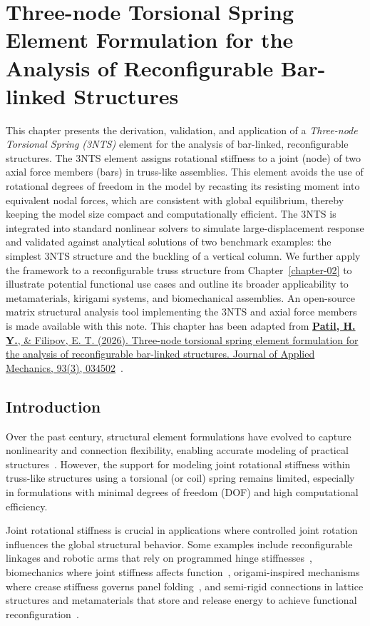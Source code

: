 \chapter{Three-node Torsional Spring Element Formulation for the Analysis of Reconfigurable Bar-linked Structures}\label{chapter-03}
This chapter presents the derivation, validation, and application of a \textit{Three-node Torsional Spring (3NTS)} element for the analysis of bar-linked, reconfigurable structures. The 3NTS element assigns rotational stiffness to a joint  (node) of two axial force members (bars) in truss-like assemblies. This element avoids the use of rotational degrees of freedom in the model by recasting its resisting moment into equivalent nodal forces, which are consistent with global equilibrium, thereby keeping the model size compact and computationally efficient. The 3NTS is integrated into standard nonlinear solvers to simulate large-displacement response and validated against analytical solutions of two benchmark examples: the simplest 3NTS structure and the buckling of a vertical column. We further apply the framework to a reconfigurable truss structure from Chapter~\ref{chapter-02} to illustrate potential functional use cases and outline its broader applicability to metamaterials, kirigami systems, and biomechanical assemblies. An open-source matrix structural analysis tool implementing the 3NTS and axial force members is made available with this note. This chapter has been adapted from \href{https://doi.org/10.1115/1.4070821}{\textbf{Patil, H. Y.}, \& Filipov, E. T. (2026). Three-node torsional spring element formulation for the analysis of reconfigurable bar-linked structures. Journal of Applied Mechanics, 93(3), 034502}~\cite{patil20263nts}.

\section{Introduction}\label{03-sec-torsional-spring-intro}
Over the past century, structural element formulations have evolved to capture nonlinearity and connection flexibility, enabling accurate modeling of practical structures~\cite{felippa2001history}. However, the support for modeling joint rotational stiffness within truss-like structures using a torsional (or coil) spring remains limited, especially in formulations with minimal degrees of freedom (DOF) and high computational efficiency.

Joint rotational stiffness is crucial in applications where controlled joint rotation influences the global structural behavior. Some examples include reconfigurable linkages and robotic arms that rely on programmed hinge stiffnesses~\cite{kim2014design,franco2021static,knox2009unidirectional,dumas2012joint}, biomechanics where joint stiffness affects function~\cite{edwards2007effect,fang2017online}, origami-inspired mechanisms where crease stiffness governs panel folding~\cite{gillman2018truss,zhu2022review,lu2023origami}, and semi-rigid connections in lattice structures and metamaterials that store and release energy to achieve functional reconfiguration~\cite{zhang2019energy,zhang2021architected,zhu2020quasi}.

